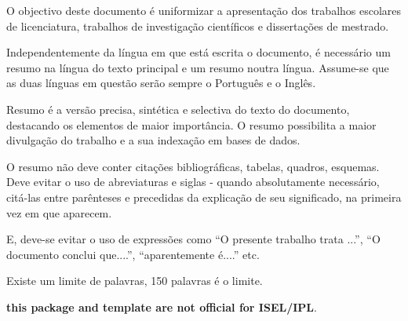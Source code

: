 \abstractPT  %

O objectivo deste documento é uniformizar a apresentação dos trabalhos escolares de licenciatura, trabalhos de investigação científicos e dissertações de mestrado.

Independentemente da língua em que está escrita o documento, é necessário um resumo na língua do texto principal e um resumo noutra língua.  Assume-se que as duas línguas em questão serão sempre o Português e o Inglês.

Resumo é a versão precisa, sintética e selectiva do texto do documento, destacando os elementos de maior importância. O resumo possibilita a maior divulgação do trabalho e a sua indexação em bases de dados.

O resumo não deve conter citações bibliográficas, tabelas, quadros, esquemas. Deve evitar o uso de abreviaturas e siglas - quando absolutamente necessário, citá-las entre parênteses e precedidas da explicação de seu significado, na primeira vez em que aparecem. 

E, deve-se evitar o uso de expressões como ``O presente trabalho trata ...'', ``O documento conclui que....'', ``aparentemente é....'' etc. 

Existe um limite de palavras, 150 palavras é o limite.

\begin{center}
	\textbf{\large this package and template are not official for ISEL/IPL}.
\end{center}